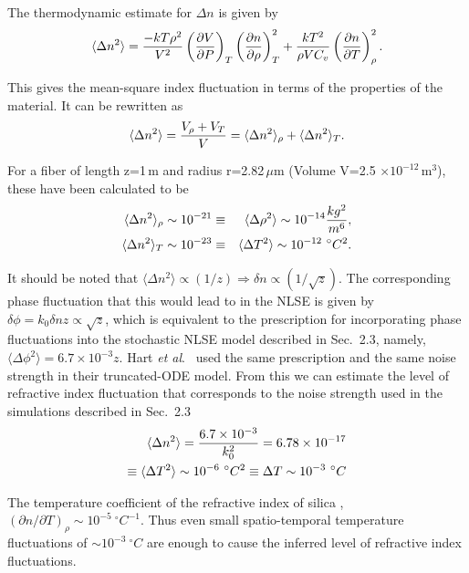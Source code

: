 The thermodynamic estimate for $\Delta n$ is given by \cite{glenn}
\begin{equation}
\langle \Delta n^{2} \rangle = {-kT\rho^2 \over V^2}  
\left( {\partial V \over \partial P} \right)_{T} 
\left( {\partial n \over \partial \rho} \right)_{T}^{2}
 + {kT^2 \over \rho VC_v} \left( {\partial n \over \partial T} \right)_{\rho}^2 .
\end{equation} 

This gives the mean-square index fluctuation in terms of the properties of 
the material. It can be rewritten as
\begin{equation}
\langle \Delta n^{2} \rangle = {V_{\rho}+V_T \over V} = \langle \Delta n^{2} \rangle_{\rho}+\langle \Delta n^{2} \rangle_{T} .
\end{equation}

For a fiber of length z=1\,m and radius r=2.82\,$\mu$m 
(Volume V=2.5 $\times 10^{-12}$\,m$^3$), these have been calculated to be 
\begin{eqnarray}
\langle \Delta n^2 \rangle_{\rho} \sim 10^{-21} & \equiv & \langle \Delta \rho^2 \rangle \sim 10^{-14} 
{kg^2 \over m^6}, \nonumber \\
\langle \Delta n^2 \rangle_T \sim 10^{-23} & \equiv & \langle \Delta T^2 \rangle \sim 10^{-12}~{^\circ}C^2 .
\end{eqnarray}

It should be noted that $\langle \Delta n^2 \rangle \propto (1/z) \Rightarrow \delta n \propto  (1 / \sqrt{z})$. The corresponding phase fluctuation that this would lead to in the NLSE is given by $\delta \phi=k_{0} \delta n z \propto \sqrt {z}$, which is equivalent to the prescription for incorporating phase fluctuations into the stochastic NLSE model described in Sec.\ 2.3, namely,  $\langle \Delta \phi^2 \rangle = 6.7 \times 10^{-3}z$. Hart {\it et al}.\ \cite{hart1} used the same prescription and the same noise strength in their truncated-ODE model. From this we can estimate the level of refractive index fluctuation that corresponds to the noise strength used in the simulations described in Sec.\ 2.3 
\begin{eqnarray}
\langle \Delta n^2 \rangle = {6.7 \times 10^{-3} \over k_0^2} = 6.78 \times 10^{-17} \nonumber\\
\equiv \langle \Delta T^{2} \rangle \sim 10^{-6}~{^\circ}C^2 \equiv \Delta T \sim 10^{-3}~{^\circ}C 
\end{eqnarray}

The temperature coefficient of the refractive index of silica \cite{glenn}, 
$(\partial n / \partial T)_{\rho} \sim 10^{-5} ~{^\circ}C^{-1}$. Thus even small spatio-temporal temperature fluctuations of $\sim 10^{-3} ~{^\circ}C$ are enough to cause the inferred level of refractive index fluctuations.

